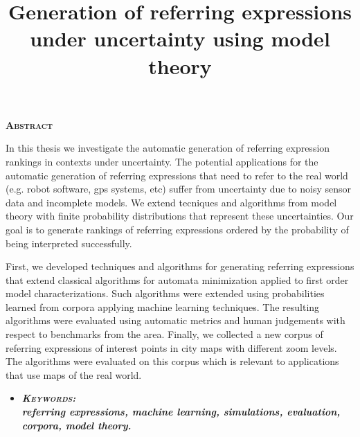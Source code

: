 \newpage

\begin{center}

{ \vspace*{1cm} }
\huge{\textbf{\textsc{\textmd{Abstract}}}}\\[1cm]

\end{center}

\title{Generation of referring expressions under uncertainty using model theory}

\normalsize{In this thesis we investigate the automatic generation of referring expression rankings in contexts under uncertainty. The potential applications for the automatic generation of referring expressions that need to refer to the real world (e.g. robot software, gps systems, etc) suffer from uncertainty due to noisy sensor data and incomplete models. We extend tecniques and algorithms from model theory with finite probability distributions that represent these uncertainties. Our goal is to generate rankings of referring expressions ordered by the probability of being interpreted successfully.

First, we developed techniques and algorithms for generating referring expressions that extend classical algorithms for automata minimization applied to first order model characterizations. Such algorithms were extended using probabilities learned from corpora applying machine learning techniques. The resulting algorithms were evaluated using automatic metrics  and human judgements with respect to benchmarks from the area. Finally, we collected a new corpus of referring expressions of interest points in city maps with different zoom levels. The algorithms were evaluated on this corpus which is relevant to applications that use maps of the real world.
}

\begin{itemize}

	\item \textbf{\emph{\textsc{Keywords:} \\ referring expressions, machine learning, simulations, evaluation, corpora, model theory.}}
\end{itemize}

